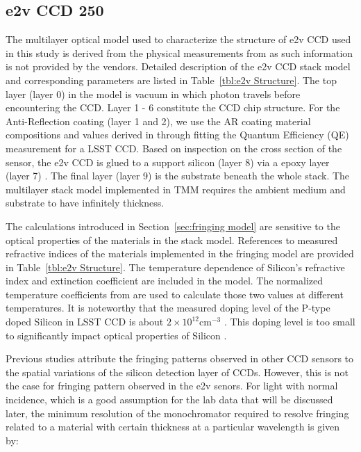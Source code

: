 \documentclass[twocolumn]{aastex63} %
\begin{document}
\begin{CJK*}{UTF8}{gbsn}




\subsection{e2v CCD 250} \label{sec:sensor structure}
The multilayer optical model used to characterize the structure of e2v CCD used in this study is derived from the physical measurements from \citet{Craig19b} as such information is not provided by the vendors. Detailed description of the e2v CCD stack model and corresponding parameters are listed in Table~\ref{tbl:e2v Structure}. The top layer (layer 0) in the model is vacuum in which photon travels before encountering the CCD. Layer 1 - 6 constitute the CCD chip structure. For the Anti-Reflection coating (layer 1 and 2), we use the AR coating material compositions and values derived in \citet{Andy15} through fitting the Quantum Efficiency (QE) measurement for a LSST CCD. Based on inspection on the cross section of the sensor, the e2v CCD is glued to a support silicon (layer 8) via a epoxy layer (layer 7)  \citep{Craig19b}. The final layer (layer 9) is the substrate beneath the whole stack. The multilayer stack model implemented in TMM requires the ambient medium  and substrate to have infinitely thickness. 

The calculations introduced in Section~\ref{sec:fringing model} are sensitive to the optical properties of the materials in the stack model. References to measured refractive indices of the materials implemented in the fringing model are provided in Table~\ref{tbl:e2v Structure}. The temperature dependence of Silicon's refractive index and extinction coefficient are included in the model. The normalized temperature coefficients from \citet{Green08} are used to calculate those two values at different temperatures. It is noteworthy that the measured doping level of the P-type doped Silicon in LSST CCD is about $2\times10^{12} \text{cm}^{-3}$ \citep{Craig19b}. This doping level is too small to significantly impact optical properties of Silicon \citep{Jellison81}.


Previous studies \citep{Malumuth03,Walsh03} attribute the fringing patterns observed in other CCD sensors to the spatial variations of the silicon detection layer of CCDs. However, this is not the case for fringing pattern observed in the e2v senors. For light with normal incidence, which is a good assumption for the lab data that will be discussed later, the minimum resolution of the monochromator required to resolve fringing related to a material with certain thickness at a particular wavelength %
is given by:


\end{CJK*}
\end{document}
